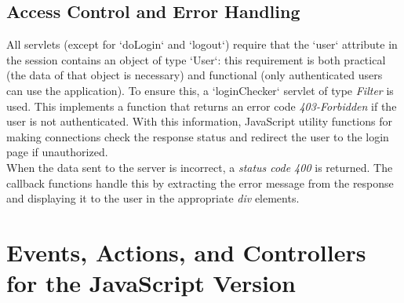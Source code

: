 \documentclass[12pt, a4paper, renqo, final]{amsart}
\let\stdsection\section
\renewcommand{\section}{\newpage\stdsection}
\begin{document}
			\subsection{Access Control and Error Handling}
				All servlets (except for `doLogin` and `logout`) require that the `user` attribute in the session contains an object of type `User`: this requirement is both practical (the data of that object is necessary) and functional (only authenticated users can use the application). To ensure this, a `loginChecker` servlet of type \textit{Filter} is used. This implements a function that returns an error code \textit{403-Forbidden} if the user is not authenticated. With this information, JavaScript utility functions for making connections check the response status and redirect the user to the login page if unauthorized.\\
				When the data sent to the server is incorrect, a \textit{status code 400} is returned. The callback functions handle this by extracting the error message from the response and displaying it to the user in the appropriate \textit{div} elements.

		\section[RIA - Events, Actions, and Controllers]{Events, Actions, and Controllers for the JavaScript Version}
\end{document}
